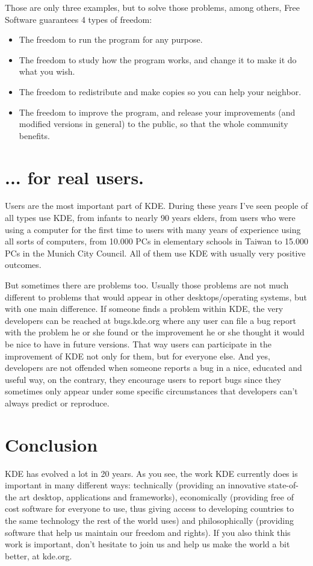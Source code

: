 Those are only three examples, but to solve those problems, among others, Free Software guarantees 4 types of freedom:

\begin{itemize}
\item The freedom to run the program for any purpose.
\item The freedom to study how the program works, and change it to make it do what you wish.
\item The freedom to redistribute and make copies so you can help your neighbor.
\item The freedom to improve the program, and release your improvements (and modified versions in general) to the public, so that the whole community benefits.
\end{itemize}

\section*{... for real users.}

Users are the most important part of KDE. During these years I've seen people of all types use KDE, from infants to nearly 90 years elders, from users who were using a computer for the first time to users with many years of experience using all sorts of computers, from 10.000 PCs in elementary schools in Taiwan to 15.000 PCs in the Munich City Council. All of them use KDE with usually very positive outcomes.

But sometimes there are problems too. Usually those problems are not much different to problems that would appear in other desktops/operating systems, but with one main difference. If someone finds a problem within KDE, the very developers can be reached at bugs.kde.org where any user can file a bug report with the problem he or she found or the improvement he or she thought it would be nice to have in future versions. That way users can participate in the improvement of KDE not only for them, but for everyone else. And yes, developers are not offended when someone reports a bug in a nice, educated and useful way, on the contrary, they encourage users to report bugs since they sometimes only appear under some specific circumstances that developers can't always predict or reproduce.

\section*{Conclusion}
KDE has evolved a lot in 20 years. As you see, the work KDE currently does is important in many different ways: technically (providing an innovative state-of-the art desktop, applications and frameworks), economically (providing free of cost software for everyone to use, thus giving access to developing countries to the same technology the rest of the world uses) and philosophically (providing software that help us maintain our freedom and rights). If you also think this work is important, don't hesitate to join us and help us make the world a bit better, at kde.org.
